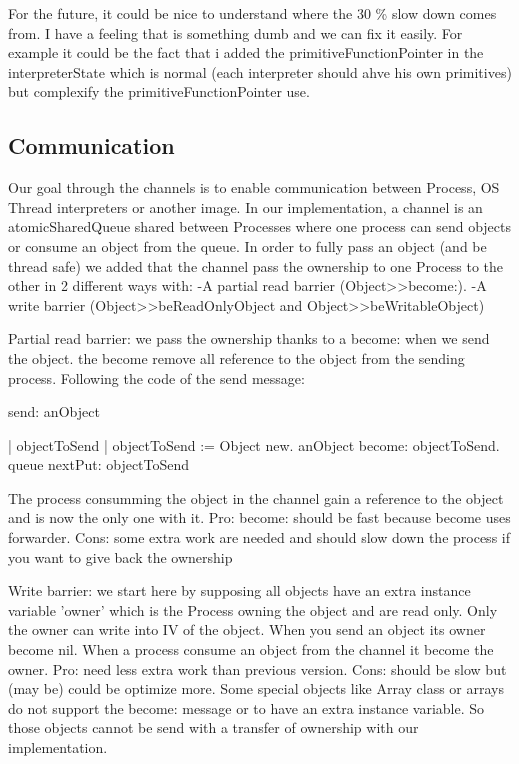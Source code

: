 \documentclass[11pt]{article} %
\begin{document}
For the future, it could be nice to understand where the 30 \% slow down comes from. I have a feeling that is something dumb and we can fix it easily. For example it could be the fact that i added the primitiveFunctionPointer in the interpreterState which is normal (each interpreter should ahve his own primitives)  but complexify the primitiveFunctionPointer use.

\subsection{Communication}
 Our goal through the channels is to enable communication between Process, OS Thread interpreters or another image. 
 In our implementation, a channel is an atomicSharedQueue shared between Processes where one process can send objects or consume an object from the queue. In order to fully pass an object (and be thread safe) we added that the channel pass the ownership to one Process to the other in 2 different ways with:
 -A partial read barrier  (Object>>become:).
 -A write barrier (Object>>beReadOnlyObject and Object>>beWritableObject)

 Partial read barrier: we pass the ownership thanks to a become: when we send the object. the become remove all reference to the object from the sending process. Following the code of the send message:

 send: anObject 

 | objectToSend |
objectToSend := Object new.
anObject become: objectToSend.
queue nextPut: objectToSend

The process consumming the object in the channel gain a reference to the object and is now the only one with it.
Pro: become: should be fast because become uses forwarder.
Cons: some extra work are needed and should slow down the process if you want to give back the ownership

Write barrier: we start here by supposing all objects have an extra instance variable 'owner' which is the Process owning the object and are read only. Only the owner can write into IV of the object. When you send an object its owner become nil. When a process consume an object from the channel it become the owner.
Pro: need less extra work than previous version.
Cons: should be slow but (may be) could be optimize more.
Some special objects like Array class or arrays do not support the become: message or to have an extra instance variable. So those objects cannot be send with a transfer of ownership with our implementation.
\end{document}

